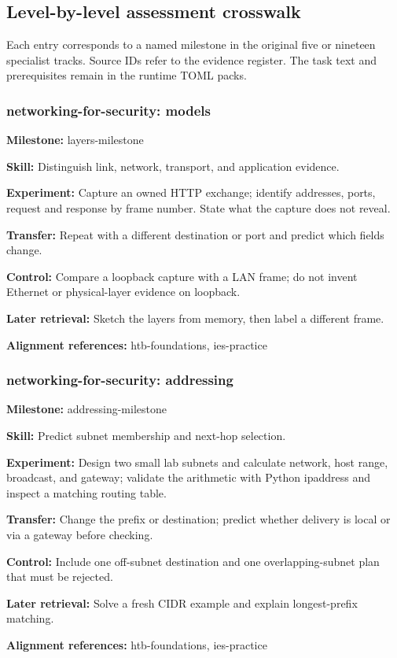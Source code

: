 \subsection{Level-by-level assessment crosswalk}
Each entry corresponds to a named milestone in the original five or nineteen specialist tracks. Source IDs refer to the evidence register. The task text and prerequisites remain in the runtime TOML packs.
\subsubsection{networking-for-security: models}
\noindent\textbf{Milestone:} layers-milestone\par
\noindent\textbf{Skill:} Distinguish link, network, transport, and application evidence.\par
\noindent\textbf{Experiment:} Capture an owned HTTP exchange; identify addresses, ports, request and response by frame number. State what the capture does not reveal.\par
\noindent\textbf{Transfer:} Repeat with a different destination or port and predict which fields change.\par
\noindent\textbf{Control:} Compare a loopback capture with a LAN frame; do not invent Ethernet or physical-layer evidence on loopback.\par
\noindent\textbf{Later retrieval:} Sketch the layers from memory, then label a different frame.\par
\noindent\textbf{Alignment references:} htb-foundations, ies-practice\par
\subsubsection{networking-for-security: addressing}
\noindent\textbf{Milestone:} addressing-milestone\par
\noindent\textbf{Skill:} Predict subnet membership and next-hop selection.\par
\noindent\textbf{Experiment:} Design two small lab subnets and calculate network, host range, broadcast, and gateway; validate the arithmetic with Python ipaddress and inspect a matching routing table.\par
\noindent\textbf{Transfer:} Change the prefix or destination; predict whether delivery is local or via a gateway before checking.\par
\noindent\textbf{Control:} Include one off-subnet destination and one overlapping-subnet plan that must be rejected.\par
\noindent\textbf{Later retrieval:} Solve a fresh CIDR example and explain longest-prefix matching.\par
\noindent\textbf{Alignment references:} htb-foundations, ies-practice\par

